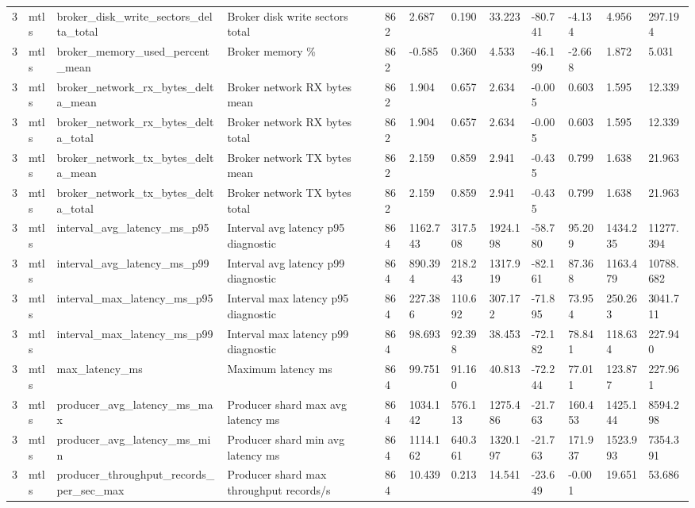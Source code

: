 \begin{longtable}{llllllllllll}
3 & mtls & broker\_disk\_write\_sectors\_delta\_total & Broker disk write sectors total & 862 & 2.687 & 0.190 & 33.223 & -80.741 & -4.134 & 4.956 & 297.194 \\
3 & mtls & broker\_memory\_used\_percent\_mean & Broker memory \% & 862 & -0.585 & 0.360 & 4.533 & -46.199 & -2.668 & 1.872 & 5.031 \\
3 & mtls & broker\_network\_rx\_bytes\_delta\_mean & Broker network RX bytes mean & 862 & 1.904 & 0.657 & 2.634 & -0.005 & 0.603 & 1.595 & 12.339 \\
3 & mtls & broker\_network\_rx\_bytes\_delta\_total & Broker network RX bytes total & 862 & 1.904 & 0.657 & 2.634 & -0.005 & 0.603 & 1.595 & 12.339 \\
3 & mtls & broker\_network\_tx\_bytes\_delta\_mean & Broker network TX bytes mean & 862 & 2.159 & 0.859 & 2.941 & -0.435 & 0.799 & 1.638 & 21.963 \\
3 & mtls & broker\_network\_tx\_bytes\_delta\_total & Broker network TX bytes total & 862 & 2.159 & 0.859 & 2.941 & -0.435 & 0.799 & 1.638 & 21.963 \\
3 & mtls & interval\_avg\_latency\_ms\_p95 & Interval avg latency p95 diagnostic & 864 & 1162.743 & 317.508 & 1924.198 & -58.780 & 95.209 & 1434.235 & 11277.394 \\
3 & mtls & interval\_avg\_latency\_ms\_p99 & Interval avg latency p99 diagnostic & 864 & 890.394 & 218.243 & 1317.919 & -82.161 & 87.368 & 1163.479 & 10788.682 \\
3 & mtls & interval\_max\_latency\_ms\_p95 & Interval max latency p95 diagnostic & 864 & 227.386 & 110.692 & 307.172 & -71.895 & 73.954 & 250.263 & 3041.711 \\
3 & mtls & interval\_max\_latency\_ms\_p99 & Interval max latency p99 diagnostic & 864 & 98.693 & 92.398 & 38.453 & -72.182 & 78.841 & 118.634 & 227.940 \\
3 & mtls & max\_latency\_ms & Maximum latency ms & 864 & 99.751 & 91.160 & 40.813 & -72.244 & 77.011 & 123.877 & 227.961 \\
3 & mtls & producer\_avg\_latency\_ms\_max & Producer shard max avg latency ms & 864 & 1034.142 & 576.113 & 1275.486 & -21.763 & 160.453 & 1425.144 & 8594.298 \\
3 & mtls & producer\_avg\_latency\_ms\_min & Producer shard min avg latency ms & 864 & 1114.162 & 640.361 & 1320.197 & -21.763 & 171.937 & 1523.993 & 7354.391 \\
3 & mtls & producer\_throughput\_records\_per\_sec\_max & Producer shard max throughput records/s & 864 & 10.439 & 0.213 & 14.541 & -23.649 & -0.001 & 19.651 & 53.686 \\

\end{longtable}
